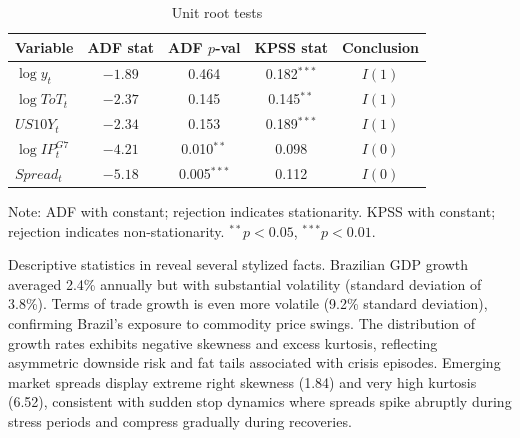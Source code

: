 \documentclass[12pt,a4paper]{article}
\numberwithin{equation}{section}
\theoremstyle{definition}
\theoremstyle{remark}
\begin{document}
\begin{table}[ht]
\centering
\begin{threeparttable}
\caption{Unit root tests}
\label{tab:unit_roots}
\begin{tabular}{@{}lcccc@{}}
\toprule
\textbf{Variable} & \textbf{ADF stat} & \textbf{ADF $p$-val} & \textbf{KPSS stat} & \textbf{Conclusion} \\
\midrule
$\log y_t$ & $-1.89$ & 0.464 & 0.182$^{***}$ & $I(1)$ \\
$\log ToT_t$ & $-2.37$ & 0.145 & 0.145$^{**}$ & $I(1)$ \\
$US10Y_t$ & $-2.34$ & 0.153 & 0.189$^{***}$ & $I(1)$ \\
$\log IP^{G7}_t$ & $-4.21$ & 0.010$^{**}$ & 0.098 & $I(0)$ \\
$Spread_t$ & $-5.18$ & 0.005$^{***}$ & 0.112 & $I(0)$ \\
\bottomrule
\end{tabular}
\begin{tablenotes}\footnotesize
\item Note: ADF with constant; rejection indicates stationarity. KPSS with constant; rejection indicates non-stationarity. $^{**}p<0.05$, $^{***}p<0.01$.
\end{tablenotes}
\end{threeparttable}
\end{table}

Descriptive statistics in  reveal several stylized facts. Brazilian GDP growth averaged 2.4\% annually but with substantial volatility (standard deviation of 3.8\%). Terms of trade growth is even more volatile (9.2\% standard deviation), confirming Brazil's exposure to commodity price swings. The distribution of growth rates exhibits negative skewness and excess kurtosis, reflecting asymmetric downside risk and fat tails associated with crisis episodes. Emerging market spreads display extreme right skewness (1.84) and very high kurtosis (6.52), consistent with sudden stop dynamics where spreads spike abruptly during stress periods and compress gradually during recoveries.
\end{document}
